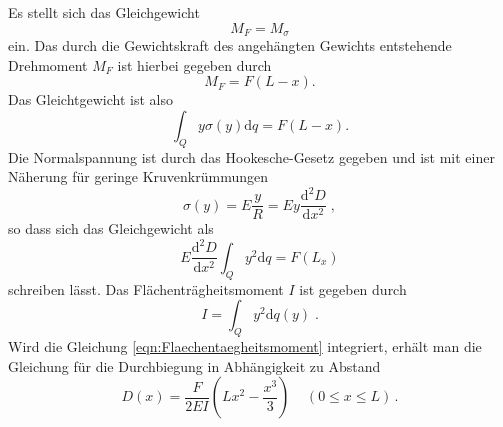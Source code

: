 Es stellt sich das Gleichgewicht
\begin{equation*}
  M_F=M_\sigma
\end{equation*}
ein. Das durch die Gewichtskraft des angehängten Gewichts entstehende Drehmoment
$M_F$ ist hierbei gegeben durch
\begin{equation*}
  M_F=F(L-x).
\end{equation*}
Das Gleichtgewicht ist also
\begin{equation}
  \int_Q y\sigma(y)\text{d}q=F(L-x).
\end{equation}
Die Normalspannung ist durch das Hookesche-Gesetz gegeben und ist mit einer Näherung
für geringe Kruvenkrümmungen
\begin{equation*}
  \sigma(y)=E\frac{y}{R}=Ey\frac{\text{d}^2D}{\text{d}x^2}\;,
\end{equation*}
so dass sich das Gleichgewicht als
\begin{equation*}
  E\frac{\text{d}^2D}{\text{d}x^2}\int_Q y^2\text{d}q=F(L_x)
\end{equation*}
schreiben lässt. Das Flächenträgheitsmoment $I$ ist gegeben durch
\begin{equation}
  I=\int_Q y^2 \text{d}q(y)\;.
  \label{eqn:Flaechentaegheitsmoment}
\end{equation}
Wird die Gleichung \eqref{eqn:Flaechentaegheitsmoment} integriert, erhält man die
Gleichung für die Durchbiegung in Abhängigkeit zu Abstand
\begin{equation}
  D(x)=\frac{F}{2EI}\left(Lx^2-\frac{x^3}{3}\right)\;\;\;\;(0\le x \le L)\,.
  \label{eqn:durchbiegung1}
\end{equation}

